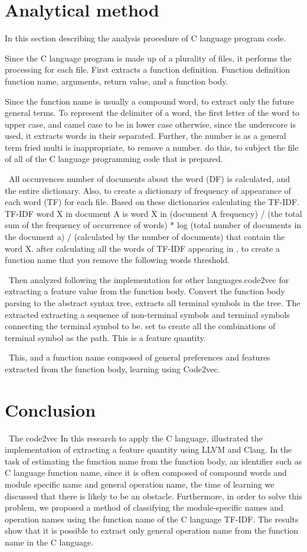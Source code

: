 \documentclass[JIP]{apris}
\begin{document}
\section{Analytical method}
In this section describing the analysis procedure of C language program code.

Since the C language program is made up of a plurality of files, it performs the processing for each file. First extracts a function definition. Function definition function name, arguments, return value, and a function body.

Since the function name is usually a compound word, to extract only the future general terms. To represent the delimiter of a word, the first letter of the word to upper case, and camel case to be in lower case otherwise, since the underscore is used, it extracts words in their separated. Further, the number is as a general term fried multi is inappropriate, to remove a number. do this, to subject the file of all of the C language programming code that is prepared.

 All occurrences number of documents about the word (DF) is calculated, and the entire dictionary. Also, to create a dictionary of frequency of appearance of each word (TF) for each file. Based on these dictionaries calculating the TF-IDF. TF-IDF word X in document A is word X in (document A frequency) / (the total sum of the frequency of occurrence of words) * log (total number of documents in the document a) / (calculated by the number of documents) that contain the word X. after calculating all the words of TF-IDF appearing in , to create a function name that you remove the following words threshold.

 Then analyzed following the implementation for other languages ​​.code2vec for extracting a feature value from the function body. Convert the function body parsing to the abstract syntax tree, extracts all terminal symbols in the tree. The extracted extracting a sequence of non-terminal symbols and terminal symbols connecting the terminal symbol to be. set to create all the combinations of terminal symbol as the path. This is a feature quantity.

 This, and a function name composed of general preferences and features extracted from the function body, learning using Code2vec.

\section{Conclusion}
 The code2vec In this research to apply the C language, illustrated the implementation of extracting a feature quantity using LLVM and Clang. In the task of estimating the function name from the function body, an identifier such as C language function name, since it is often composed of compound words and module specific name and general operation name, the time of learning we discussed that there is likely to be an obstacle. Furthermore, in order to solve this problem, we proposed a method of classifying the module-specific names and operation names using the function name of the C language TF-IDF. The results show that it is possible to extract only general operation name from the function name in the C language.
\end{document}
